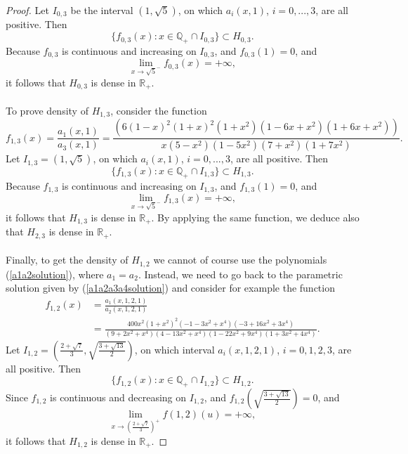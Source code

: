 \documentclass[10pt]{amsart}
\theoremstyle{plain}
\def\bbb{\mathbb}
\newcommand{\R}{\bbb{R}}
\newcommand{\Q}{\bbb{Q}}
\begin{document}
\begin{proof}
Let $I_{0,3}$ be the interval $(1, \sqrt{5})$, on which $a_i(x,1)$, $i=0,...,3$, are all positive. Then
\[ \{ f_{0,3}(x): x \in \Q_{+} \cap I_{0,3} \} \subset H_{0,3}. \]
Because $f_{0,3}$ is continuous and increasing on $I_{0,3}$, and $f_{0,3}(1)=0$, and
\[ \lim_{x \rightarrow \sqrt{5}^{-}} f_{0,3}(x) = +\infty, \]
it follows that $H_{0,3}$ is dense in $\R_{+}$. \\ \\
To prove density of $H_{1,3}$, consider the function
\[ f_{1,3}(x) = \frac{a_1(x,1)}{a_3(x,1)} = \frac{ (6(1-x)^2(1+x)^2(1+x^2)(1-6x+x^2)(1+6x+x^2))}{ x(5-x^2)(1-5x^2)(7+x^2)(1+7x^2)}. \]
Let $I_{1,3} = (1, \sqrt{5})$, on which $a_i(x,1)$, $i=0,...,3$, are all positive. Then
\[ \{ f_{1,3}(x): x \in \Q_{+} \cap I_{1,3} \} \subset H_{1,3}. \]
Because $f_{1,3}$ is continuous and increasing on $I_{1,3}$, and $f_{1,3}(1)=0$, and
\[ \lim_{x \rightarrow \sqrt{5}^{-}} f_{1,3}(x) = +\infty, \]
it follows that $H_{1,3}$ is dense in $\R_{+}$. By applying the same function, we deduce also that $H_{2,3}$ is dense in $\R_{+}$. \\ \\
Finally, to get the density of $H_{1,2}$ we cannot of course use the polynomials (\ref{a1a2solution}), where $a_1=a_2$. Instead, we need to go back to the parametric solution given by (\ref{a1a2a3a4solution}) and consider for example the function
\begin{align*}
  f_{1,2}(x) & = \frac{a_1(x,1,2,1)}{a_2(x,1,2,1)} \\
  & = \frac{400x^2(1+x^2)^2(-1-3x^2+x^4)(-3+16x^2+3x^4)}{(9+2x^2+x^4)(4-13x^2+x^4)(1-22x^2+9x^4)(1+3x^2+4x^4)}.
\end{align*}
Let $I_{1,2}=\left( \frac{2+\sqrt{7}}{3}, \sqrt{ \frac{3+\sqrt{13}}{2}} \right)$, on which interval $a_i(x,1,2,1)$, $i=0,1,2,3$, are all positive. Then
\[ \{ f_{1,2}(x): x \in \Q_{+} \cap I_{1,2} \} \subset H_{1,2}. \]
Since $f_{1,2}$ is continuous and decreasing on $I_{1,2}$, and
$f_{1,2}\left( \sqrt{ \frac{3+\sqrt{13}}{2}} \right)=0$, and
\[ \lim_{x \rightarrow \left( \frac{2+\sqrt{7}}{3} \right)^{+}} f(1,2)(u) = +\infty, \]
it follows that $H_{1,2}$ is dense in $\R_{+}$.

\end{proof}
\end{document}
